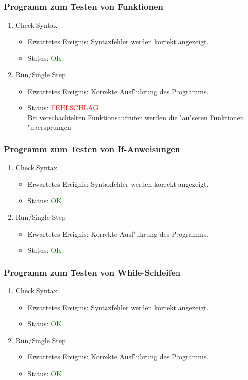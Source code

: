 \subsubsection{Programm zum Testen von Funktionen}
\begin{enumerate}
\item Check Syntax
\begin{itemize}
\item Erwartetes Ereignis: Syntaxfehler werden korrekt angezeigt.
\item Status: \textcolor{green}{OK}
\end{itemize}
\item Run/Single Step
\begin{itemize}
\item Erwartetes Ereignis: Korrekte Ausf"uhrung des Programms.
\item Status: \textcolor{red}{FEHLSCHLAG} \\
Bei verschachtelten Funktionsaufrufen werden die "au"seren Funktionen "ubersprungen
\end{itemize}
\end{enumerate}
\subsubsection{Programm zum Testen von If-Anweisungen}
\begin{enumerate}
\item Check Syntax
\begin{itemize}
\item Erwartetes Ereignis: Syntaxfehler werden korrekt angezeigt.
\item Status: \textcolor{green}{OK}
\end{itemize}
\item Run/Single Step
\begin{itemize}
\item Erwartetes Ereignis: Korrekte Ausf"uhrung des Programms.
\item Status: \textcolor{green}{OK}
\end{itemize}
\end{enumerate}
\subsubsection{Programm zum Testen von While-Schleifen}
\begin{enumerate}
\item Check Syntax
\begin{itemize}
\item Erwartetes Ereignis: Syntaxfehler werden korrekt angezeigt.
\item Status: \textcolor{green}{OK}
\end{itemize}
\item Run/Single Step
\begin{itemize}
\item Erwartetes Ereignis: Korrekte Ausf"uhrung des Programms.
\item Status: \textcolor{green}{OK}
\end{itemize}
\end{enumerate}
